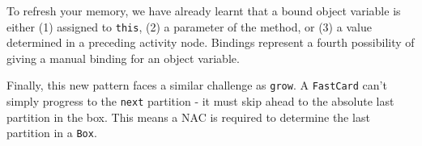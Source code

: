 To refresh your memory, we have already learnt that a bound object variable is either (1) assigned to \texttt{this}, (2) a parameter of the method, or (3) a
value determined in a preceding activity node. Bindings represent a fourth possibility of giving a manual binding for an object variable.

Finally, this new pattern faces a similar challenge as \texttt{grow}. A \texttt{FastCard} can't simply progress to the \texttt{next} partition - it
must skip ahead to the absolute last partition in the box. This means a NAC is required to determine the last partition in a \texttt{Box}.

  







